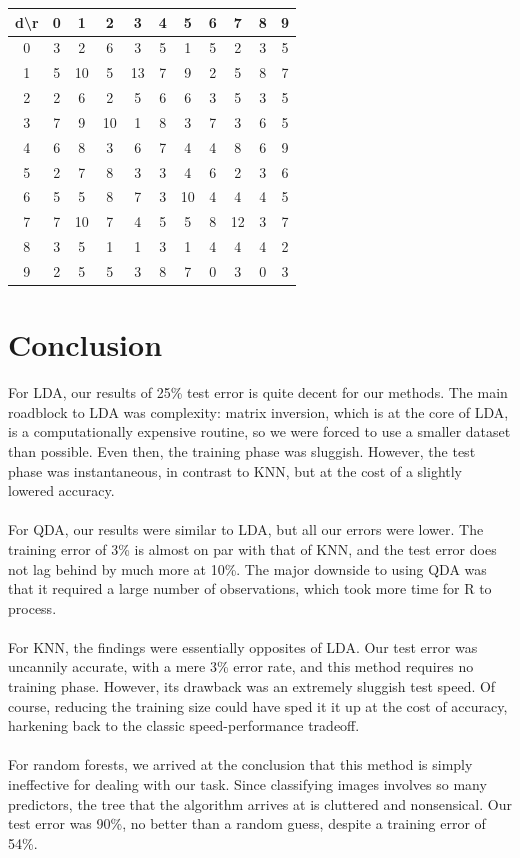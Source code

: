 \documentclass[10pt]{extarticle}
\begin{document}
\begin{minipage}{.4\textwidth}
\begin{tabular}{c | c c c c c c c c c c}
 d\textbackslash r&0&1&2&3&4&5&6&7&8&9\\ \hline
 0&3&2&6&3&5&1&5&2&3&5\\
 1&5&10&5&13&7&9&2&5&8&7\\
 2&2&6&2&5&6&6&3&5&3&5\\
 3&7&9&10&1&8&3&7&3&6&5\\
 4&6&8&3&6&7&4&4&8&6&9\\
 5&2&7&8&3&3&4&6&2&3&6\\
 6&5&5&8&7&3&10&4&4&4&5\\
 7&7&10&7&4&5&5&8&12&3&7\\
 8&3&5&1&1&3&1&4&4&4&2\\
 9&2&5&5&3&8&7&0&3&0&3
 \end{tabular}
\end{minipage}
\section{Conclusion}
For LDA, our results of 25\% test error is quite decent for our methods. The main roadblock to LDA was complexity: matrix inversion, which is at the core of LDA, is a computationally expensive routine, so we were forced to use a smaller dataset than possible. Even then, the training phase was sluggish. However, the test phase was instantaneous, in contrast to KNN, but at the cost of a slightly lowered accuracy. \\\\
For QDA, our results were similar to LDA, but all our errors were lower. The training error of 3\% is almost on par with that of KNN, and the test error does not lag behind by much more at 10\%. The major downside to using QDA was that it required a large number of observations, which took more time for R to process.\\\\
For KNN, the findings were essentially opposites of LDA. Our test error was uncannily accurate, with a mere 3\% error rate, and this method requires no training phase. However, its drawback was an extremely sluggish test speed. Of course, reducing the training size could have sped it it up at the cost of accuracy, harkening back to the classic speed-performance tradeoff. \\\\
For random forests, we arrived at the conclusion that this method is simply ineffective for dealing with our task. Since classifying images involves so many predictors, the tree that the algorithm arrives at is cluttered and nonsensical. Our test error was 90\%, no better than a random guess, despite a training error of 54\%. 
\end{document}
